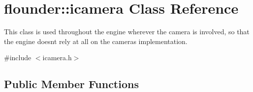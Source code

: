 \hypertarget{classflounder_1_1icamera}{}\section{flounder\+:\+:icamera Class Reference}
\label{classflounder_1_1icamera}


This class is used throughout the engine wherever the camera is involved, so that the engine doesn\textquotesingle{}t rely at all on the camera\textquotesingle{}s implementation.  




{\ttfamily \#include $<$icamera.\+h$>$}

\subsection*{Public Member Functions}
